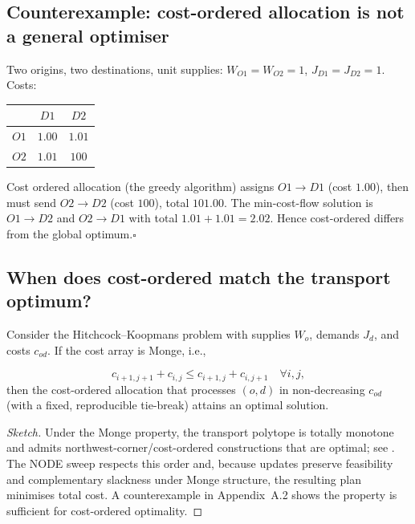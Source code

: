 \subsection{Counterexample: cost-ordered allocation is not a general optimiser}\label{si:counterexample}

Two origins, two destinations, unit supplies: $W_{O1}=W_{O2}=1$, $J_{D1}=J_{D2}=1$. Costs:
\begin{center}
\begin{tabular}{c|cc}
 & $D1$ & $D2$\\\hline
$O1$ & $1.00$ & $1.01$\\
$O2$ & $1.01$ & $100$
\end{tabular}
\end{center}
Cost ordered allocation (the greedy algorithm) assigns $O1\!\to\!D1$ (cost $1.00$), then must send $O2\!\to\!D2$ (cost $100$), total $101.00$. The min-cost-flow solution is $O1\!\to\!D2$ and $O2\!\to\!D1$ with total $1.01+1.01=2.02$. Hence cost-ordered differs from the global optimum.\hfill$\square$

\subsection{When does cost-ordered match the transport optimum?}\label{si:tp-conditions}

\begin{proposition}\label{prop:monge}
Consider the Hitchcock--Koopmans problem with supplies $W_o$, demands $J_d$, and
costs $c_{od}$. If the cost array is Monge, i.e.,

\begin{equation}
    c_{i+1,j+1}+c_{i,j} \le c_{i+1,j}+c_{i,j+1}\quad \forall i,j,
\end{equation}
then the cost-ordered allocation that processes $(o,d)$ in non-decreasing $c_{od}$
(with a fixed, reproducible tie-break) attains an optimal solution. 
\end{proposition}

\begin{proof}[Sketch]
Under the Monge property, the transport polytope is totally monotone and admits
northwest-corner/cost-ordered constructions that are optimal; see \citet{BurkardKlinzRudolf1996}.
The NODE sweep respects this order and, because updates preserve feasibility and
complementary slackness under Monge structure, the resulting plan minimises total cost.
A counterexample in Appendix~A.2 shows the property is sufficient for cost-ordered optimality.
\end{proof}


